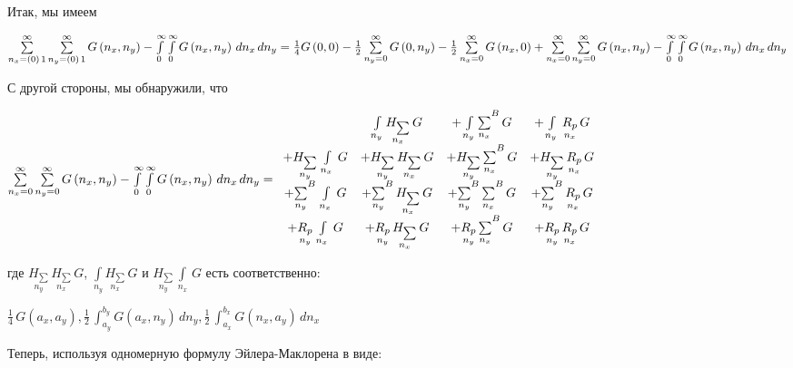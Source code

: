 \documentclass[11pt]{article}
\begin{document}
    Итак, мы имеем

\(\sum\limits_{n_x=\left(0\right)\,1}^{\infty} \sum\limits_{n_y=\left(0\right)\,1}^{\infty} G\left(n_x, n_y\right) - \int\limits_{0}^{\infty} \int\limits_{0}^{\infty} G\left(n_x, n_y\right)\,d{n_x}\,d{n_y} = \\ \frac{1}{4}G\left(0, 0\right) -\frac{1}{2}\sum\limits_{n_y=0}^{\infty}{G\left(0, n_y\right)} -\frac{1}{2}\sum\limits_{n_x=0}^{\infty}{G\left(n_x, 0\right)} +\sum\limits_{n_x=0}^{\infty}\sum\limits_{n_y=0}^{\infty}{G\left(n_x, n_y\right)} - \int\limits_{0}^{\infty} \int\limits_{0}^{\infty} G\left(n_x, n_y\right)\,d{n_x}\,d{n_y}\)

    С другой стороны, мы обнаружили, что

\(\sum\limits_{n_x=0}^{\infty} \sum\limits_{n_y=0}^{\infty} G\left(n_x, n_y\right) -\int\limits_{0}^{\infty} \int\limits_{0}^{\infty} G\left(n_x, n_y\right)\,d{n_x}\,d{n_y} = \\ \begin{array}{cccc}  \, &  \int\limits_{n_y}^{} \underset{n_x}{H_{\sum}}\,G &  + \int\limits_{n_y}^{}{\sum\limits_{n_x}^{}}^{B}\,G &  + \int\limits_{n_y}^{}\,\underset{n_x}{R_{p}}\,G \\  +\underset{n_y}{H_{\sum}}\,\int\limits_{n_x}^{}\,G &  + \underset{n_y}{H_{\sum}}\,\underset{n_x}{H_{\sum}}\,G &  + \underset{n_y}{H_{\sum}}\,{\sum\limits_{n_x}^{}}^{B}\,G &  + \underset{n_y}{H_{\sum}}\,\underset{n_x}{R_{p}}\,G \\  + {\sum\limits_{n_y}^{}}^{B}\,\int\limits_{n_x}^{}\,G &  + {\sum\limits_{n_y}^{}}^{B}\,\underset{n_x}{H_{\sum}}\,G &  + {\sum\limits_{n_y}^{}}^{B}\,{\sum\limits_{n_x}^{}}^{B}\,G &  + {\sum\limits_{n_y}^{}}^{B}\,\underset{n_x}{R_{p}}\,G \\  + \underset{n_y}{R_{p}}\,\int\limits_{n_x}^{}\,G &  + \underset{n_y}{R_{p}}\,\underset{n_x}{H_{\sum}}\,G &  + \underset{n_y}{R_{p}}\,{\sum\limits_{n_x}^{}}^{B}\,G &  + \underset{n_y}{R_{p}}\,\underset{n_x}{R_{p}}\,G \end{array}\)

    где \(\underset{n_y}{H_{\sum}}\,\underset{n_x}{H_{\sum}}\,G\),
\(\int\limits_{n_y}^{} \underset{n_x}{H_{\sum}}\,G\) и
\(\underset{n_y}{H_{\sum}}\,\int\limits_{n_x}^{}\,G\) есть
соответственно:

    \(\frac{1}{4} \, G\left(a_{x}, a_{y}\right) , \frac{1}{2} \, \int_{a_{y}}^{b_{y}} G\left(a_{x}, n_{y}\right)\,{d n_{y}} , \frac{1}{2} \, \int_{a_{x}}^{b_{x}} G\left(n_{x}, a_{y}\right)\,{d n_{x}}\)

    Теперь, используя одномерную формулу Эйлера-Маклорена в виде:
\end{document}
